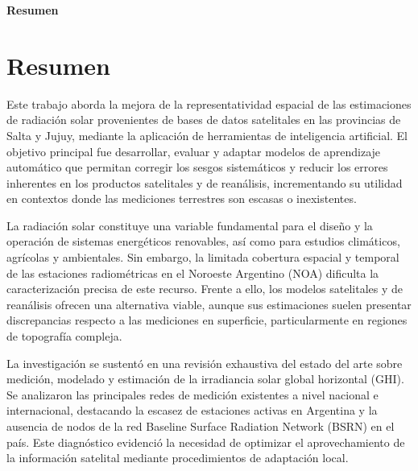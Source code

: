 \documentclass[letterpaper,12pt, twoside]{report}
\makeatletter
\let\newauthor\@author
\providecommand{\DIFdeltex}[1]{{\protect\color{red} \scriptsize #1}} %
\providecommand{\DIFdel}[1]{\texorpdfstring{\DIFdeltex{#1}}{}} %
\makeatother
\begin{document}

\DIFdel{\textbf{Resumen}
}%

\section*{\DIFdel{Resumen}}

\DIFdel{Este trabajo aborda la mejora de la representatividad espacial de las estimaciones de radiación solar provenientes de bases de datos satelitales en las provincias de Salta y Jujuy, mediante la aplicación de herramientas de inteligencia artificial. El objetivo principal fue desarrollar, evaluar y adaptar modelos de aprendizaje automático que permitan corregir los sesgos sistemáticos y reducir los errores inherentes en los productos satelitales y de reanálisis, incrementando su utilidad en contextos donde las mediciones terrestres son escasas o inexistentes.
}%

\DIFdel{La radiación solar constituye una variable fundamental para el diseño y la operación de sistemas energéticos renovables, así como para estudios climáticos, agrícolas y ambientales. Sin embargo, la limitada cobertura espacial y temporal de las estaciones radiométricas en el Noroeste Argentino (NOA) dificulta la caracterización precisa de este recurso. Frente a ello, los modelos satelitales y de reanálisis ofrecen una alternativa viable, aunque sus estimaciones suelen presentar discrepancias respecto a las mediciones en superficie, particularmente en regiones de topografía compleja.
}%

\DIFdel{La investigación se sustentó en una revisión exhaustiva del estado del arte sobre medición, modelado y estimación de la irradiancia solar global horizontal (GHI). Se analizaron las principales redes de medición existentes a nivel nacional e internacional, destacando la escasez de estaciones activas en Argentina y la ausencia de nodos de la red Baseline Surface Radiation Network (BSRN) en el país. Este diagnóstico evidenció la necesidad de optimizar el aprovechamiento de la información satelital mediante procedimientos de adaptación local.
}%
\end{document}
